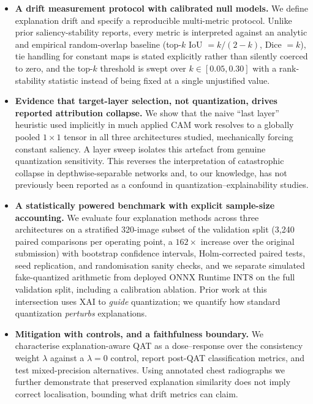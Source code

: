 \documentclass[fleqn,10pt]{wlscirep}
\begin{document}
\begin{itemize}[leftmargin=1.2em,itemsep=2pt]
  \item \textbf{A drift measurement protocol with calibrated null models.} We define explanation drift and specify a reproducible multi-metric protocol. Unlike prior saliency-stability reports, every metric is interpreted against an analytic and empirical random-overlap baseline (top-$k$ IoU $= k/(2-k)$, Dice $= k$), tie handling for constant maps is stated explicitly rather than silently coerced to zero, and the top-$k$ threshold is swept over $k \in [0.05, 0.30]$ with a rank-stability statistic instead of being fixed at a single unjustified value.
  \item \textbf{Evidence that target-layer selection, not quantization, drives reported attribution collapse.} We show that the naive ``last layer'' heuristic used implicitly in much applied CAM work resolves to a globally pooled $1\times1$ tensor in all three architectures studied, mechanically forcing constant saliency. A layer sweep isolates this artefact from genuine quantization sensitivity. This reverses the interpretation of catastrophic collapse in depthwise-separable networks and, to our knowledge, has not previously been reported as a confound in quantization--explainability studies.
  \item \textbf{A statistically powered benchmark with explicit sample-size accounting.} We evaluate four explanation methods across three architectures on a stratified 320-image subset of the validation split (3{,}240 paired comparisons per operating point, a $162\times$ increase over the original submission) with bootstrap confidence intervals, Holm-corrected paired tests, seed replication, and randomisation sanity checks, and we separate simulated fake-quantized arithmetic from deployed ONNX Runtime INT8 on the full validation split, including a calibration ablation. Prior work at this intersection uses XAI to \emph{guide} quantization; we quantify how standard quantization \emph{perturbs} explanations.
  \item \textbf{Mitigation with controls, and a faithfulness boundary.} We characterise explanation-aware QAT as a dose--response over the consistency weight $\lambda$ against a $\lambda = 0$ control, report post-QAT classification metrics, and test mixed-precision alternatives. Using annotated chest radiographs we further demonstrate that preserved explanation similarity does not imply correct localisation, bounding what drift metrics can claim.
\end{itemize}
\end{document}
